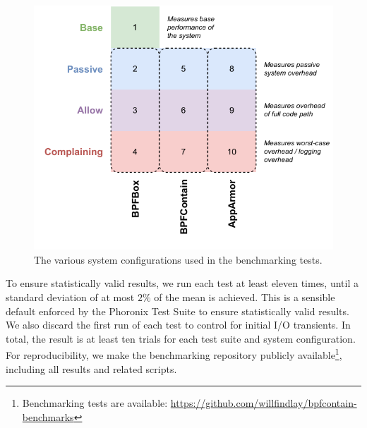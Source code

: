 \begin{figure}[htp]
  \centering
  \includegraphics[width=0.6\linewidth]{figs/eval/configuration.pdf}
  \caption[Benchmarking system configurations]{
    The various system configurations used in the benchmarking tests.
  }%
  \label{fig:configuration}
\end{figure}

To ensure statistically valid results, we run each test at least eleven times, until
a standard deviation of at most $2\%$ of the mean is achieved. This is a sensible default
enforced by the Phoronix Test Suite to ensure statistically valid results. We also discard
the first run of each test to control for initial I/O transients. In total, the result is
at least ten trials for each test suite and system configuration. For reproducibility, we
make the benchmarking repository publicly available\footnote{Benchmarking tests are
available: \url{https://github.com/willfindlay/bpfcontain-benchmarks}}, including all
results and related scripts.



